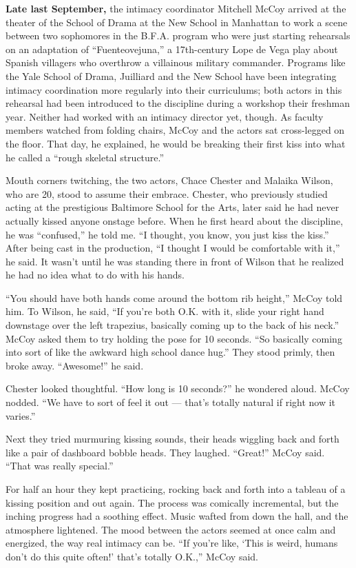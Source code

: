 \textbf{Late last September,} the intimacy coordinator Mitchell McCoy
arrived at the theater of the School of Drama at the New School in
Manhattan to work a scene between two sophomores in the B.F.A. program
who were just starting rehearsals on an adaptation of ``Fuenteovejuna,''
a 17th-century Lope de Vega play about Spanish villagers who overthrow a
villainous military commander. Programs like the Yale School of Drama,
Juilliard and the New School have been integrating intimacy coordination
more regularly into their curriculums; both actors in this rehearsal had
been introduced to the discipline during a workshop their freshman year.
Neither had worked with an intimacy director yet, though. As faculty
members watched from folding chairs, McCoy and the actors sat
cross-legged on the floor. That day, he explained, he would be breaking
their first kiss into what he called a ``rough skeletal structure.''

Mouth corners twitching, the two actors, Chace Chester and Malaika
Wilson, who are 20, stood to assume their embrace. Chester, who
previously studied acting at the prestigious Baltimore School for the
Arts, later said he had never actually kissed anyone onstage before.
When he first heard about the discipline, he was ``confused,'' he told
me. ``I thought, you know, you just kiss the kiss.'' After being cast in
the production, ``I thought I would be comfortable with it,'' he said.
It wasn't until he was standing there in front of Wilson that he
realized he had no idea what to do with his hands.

``You should have both hands come around the bottom rib height,'' McCoy
told him. To Wilson, he said, ``If you're both O.K. with it, slide your
right hand downstage over the left trapezius, basically coming up to the
back of his neck.'' McCoy asked them to try holding the pose for 10
seconds. ``So basically coming into sort of like the awkward high school
dance hug.'' They stood primly, then broke away. ``Awesome!'' he said.

Chester looked thoughtful. ``How long is 10 seconds?'' he wondered
aloud. McCoy nodded. ``We have to sort of feel it out --- that's totally
natural if right now it varies.''

Next they tried murmuring kissing sounds, their heads wiggling back and
forth like a pair of dashboard bobble heads. They laughed. ``Great!''
McCoy said. ``That was really special.''

For half an hour they kept practicing, rocking back and forth into a
tableau of a kissing position and out again. The process was comically
incremental, but the inching progress had a soothing effect. Music
wafted from down the hall, and the atmosphere lightened. The mood
between the actors seemed at once calm and energized, the way real
intimacy can be. ``If you're like, `This is weird, humans don't do this
quite often!' that's totally O.K.,'' McCoy said.

